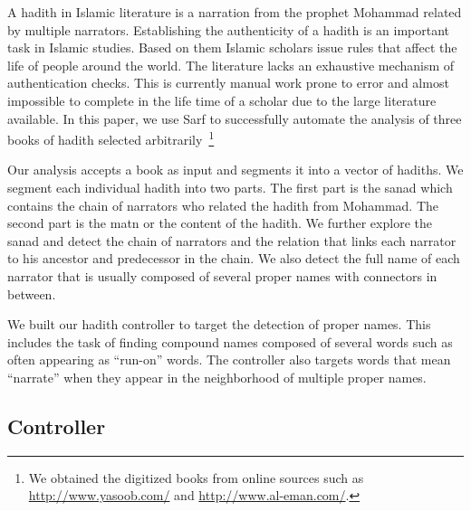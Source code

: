 \documentclass[11pt]{article}
\begin{document}
A hadith in Islamic literature is a narration from the prophet Mohammad
related by multiple narrators.
Establishing the authenticity of a hadith is an important task
in Islamic studies. 
Based on them Islamic scholars issue rules that affect the life
of people around the world. 
The literature lacks an exhaustive mechanism of authentication
checks. This is currently manual work prone to error and almost
impossible to complete in the life time of a scholar due to the
large literature available. 
In this paper, we use Sarf to successfully automate the
analysis of three books of hadith selected 
arbitrarily~\cite{IbnHanbal,AlKulayni,AlTousi}\footnote{We obtained
  the digitized books from online sources such as 
  \href{http://www.yasoob.com/}{http://www.yasoob.com/} and 
  \href{http://www.al-eman.com/}{http://www.al-eman.com/}. }



Our analysis accepts a book as input
and segments it into a vector of hadiths. 
We segment each individual hadith into two parts. 
The first part is the sanad which
contains the chain of narrators who related the hadith
from Mohammad. 
The second part is the matn or the content
of the hadith. 
We further explore the sanad and
detect the chain of narrators and 
the relation that links each narrator to his ancestor and 
predecessor in the chain. 
We also detect the full name of each narrator that is
usually composed of several proper names with connectors
in between. 

We built our hadith controller to target
the detection of proper names. 
This includes the task of finding compound names 
composed of several words such as  often
appearing as ``run-on'' words.
The controller also targets words that mean ``narrate'' when
they appear in the neighborhood of multiple proper names. 

\subsection{Controller}
\label{sec:controller}
\end{document}
